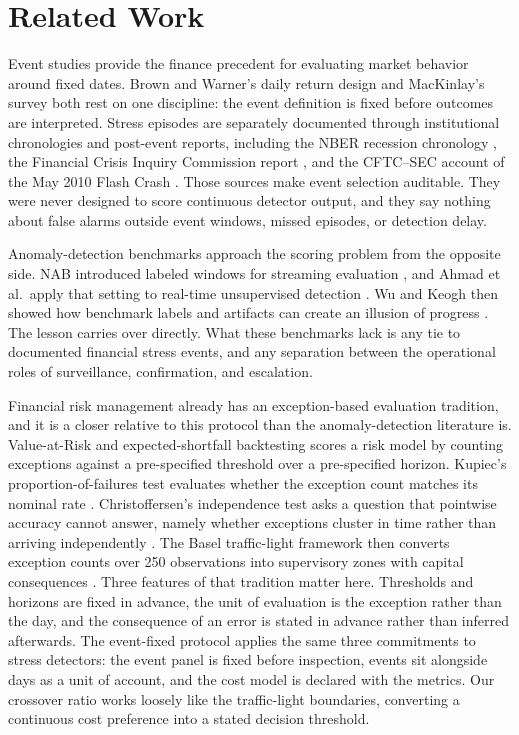 \documentclass[pdflatex,sn-mathphys-num,iicol]{sn-jnl}
\begin{document}
\section{Related Work}
\label{sec:related}
Event studies provide the finance precedent for evaluating market behavior around fixed dates. Brown and Warner's daily return design \cite{brown1985} and MacKinlay's survey \cite{mackinlay1997} both rest on one discipline: the event definition is fixed before outcomes are interpreted. Stress episodes are separately documented through institutional chronologies and post-event reports, including the NBER recession chronology \cite{nber2023}, the Financial Crisis Inquiry Commission report \cite{fcic2011}, and the CFTC--SEC account of the May 2010 Flash Crash \cite{cftcsec2010}. Those sources make event selection auditable. They were never designed to score continuous detector output, and they say nothing about false alarms outside event windows, missed episodes, or detection delay.

Anomaly-detection benchmarks approach the scoring problem from the opposite side. NAB introduced labeled windows for streaming evaluation \cite{lavin2015}, and Ahmad et al.\ apply that setting to real-time unsupervised detection \cite{ahmad2017}. Wu and Keogh then showed how benchmark labels and artifacts can create an illusion of progress \cite{wu2022}. The lesson carries over directly. What these benchmarks lack is any tie to documented financial stress events, and any separation between the operational roles of surveillance, confirmation, and escalation.

Financial risk management already has an exception-based evaluation tradition, and it is a closer relative to this protocol than the anomaly-detection literature is. Value-at-Risk and expected-shortfall backtesting scores a risk model by counting exceptions against a pre-specified threshold over a pre-specified horizon. Kupiec's proportion-of-failures test evaluates whether the exception count matches its nominal rate \cite{kupiec1995}. Christoffersen's independence test asks a question that pointwise accuracy cannot answer, namely whether exceptions cluster in time rather than arriving independently \cite{christoffersen1998}. The Basel traffic-light framework then converts exception counts over 250 observations into supervisory zones with capital consequences \cite{bcbs1996}. Three features of that tradition matter here. Thresholds and horizons are fixed in advance, the unit of evaluation is the exception rather than the day, and the consequence of an error is stated in advance rather than inferred afterwards. The event-fixed protocol applies the same three commitments to stress detectors: the event panel is fixed before inspection, events sit alongside days as a unit of account, and the cost model is declared with the metrics. Our crossover ratio works loosely like the traffic-light boundaries, converting a continuous cost preference into a stated decision threshold.
\end{document}
